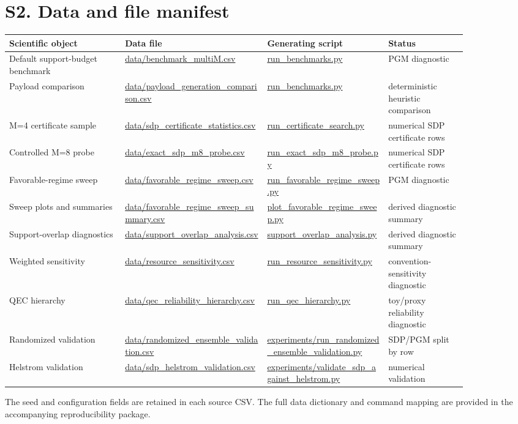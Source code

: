\documentclass[10pt]{article}
\newcommand{\suppsection}[1]{\section*{#1}}
\begin{document}
\suppsection{S2. Data and file manifest}
\begin{center}\small
\begin{tabular}{p{0.22\linewidth}p{0.27\linewidth}p{0.23\linewidth}p{0.15\linewidth}}
\toprule
Scientific object & Data file & Generating script & Status\\
\midrule
Default support-budget benchmark & \url{data/benchmark_multiM.csv} & \url{run_benchmarks.py} & PGM diagnostic\\
Payload comparison & \url{data/payload_generation_comparison.csv} & \url{run_benchmarks.py} & deterministic heuristic comparison\\
M=4 certificate sample & \url{data/sdp_certificate_statistics.csv} & \url{run_certificate_search.py} & numerical SDP certificate rows\\
Controlled M=8 probe & \url{data/exact_sdp_m8_probe.csv} & \url{run_exact_sdp_m8_probe.py} & numerical SDP certificate rows\\
Favorable-regime sweep & \url{data/favorable_regime_sweep.csv} & \url{run_favorable_regime_sweep.py} & PGM diagnostic\\
Sweep plots and summaries & \url{data/favorable_regime_sweep_summary.csv} & \url{plot_favorable_regime_sweep.py} & derived diagnostic summary\\
Support-overlap diagnostics & \url{data/support_overlap_analysis.csv} & \url{support_overlap_analysis.py} & derived diagnostic summary\\
Weighted sensitivity & \url{data/resource_sensitivity.csv} & \url{run_resource_sensitivity.py} & convention-sensitivity diagnostic\\
QEC hierarchy & \url{data/qec_reliability_hierarchy.csv} & \url{run_qec_hierarchy.py} & toy/proxy reliability diagnostic\\
Randomized validation & \url{data/randomized_ensemble_validation.csv} & \url{experiments/run_randomized_ensemble_validation.py} & SDP/PGM split by row\\
Helstrom validation & \url{data/sdp_helstrom_validation.csv} & \url{experiments/validate_sdp_against_helstrom.py} & numerical validation\\
\bottomrule
\end{tabular}
\end{center}
The seed and configuration fields are retained in each source CSV. The full data dictionary and command mapping are provided in the accompanying reproducibility package.
\end{document}
